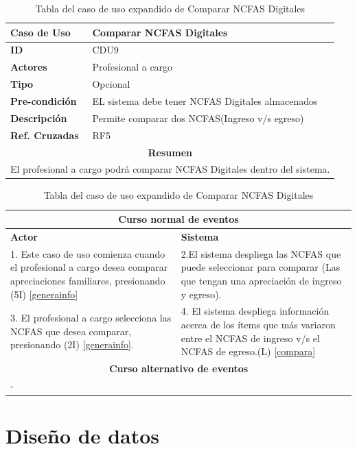 \begin{table}
	\centering
	\begin{tabular}{|p{6cm} |p{6cm}|}
		\hline \textbf{Caso de Uso} & Comparar NCFAS Digitales \\ 
		\hline \textbf{ID} & CDU9 \\ 
		\hline \textbf{Actores} & Profesional a cargo \\ 
		\hline \textbf{Tipo} & Opcional \\ 
		\hline \textbf{Pre-condición} & EL sistema debe tener NCFAS Digitales almacenados \\ 
		\hline \textbf{Descripción} & Permite comparar dos NCFAS(Ingreso v/s egreso) \\
		\hline \textbf{Ref. Cruzadas} & RF5 \\ 
		\hline
		\multicolumn{2}{|c|}{\textbf{Resumen}} \\
		\hline
		\multicolumn{2}{|p{12cm}|}{El profesional a cargo podrá comparar NCFAS Digitales dentro del sistema.} \\
		
	\end{tabular}  
	\begin{tabular}{|p{6cm}|p{6cm}|}
		\multicolumn{2}{|c|}{\textbf{Curso normal de eventos}} \\
		\hline \textbf{Actor} & \textbf{Sistema} \\ 
		\hline 1. Este caso de uso comienza cuando el profesional a cargo desea comparar apreciaciones familiares, presionando (5I) \ref{generainfo} & 2.El sistema despliega las NCFAS que puede seleccionar para comparar (Las que tengan una apreciación de ingreso y egreso).  \\ 
		3. El profesional a cargo selecciona las NCFAS que desea comparar, presionando (2I) \ref{generainfo}.& 4. El sistema despliega información acerca de los ítems que más variaron entre el NCFAS de ingreso v/s el NCFAS de egreso.(L) \ref{compara} \\
		\hline
		\multicolumn{2}{|c|}{\textbf{Curso alternativo de eventos}} \\
		\hline
		\multicolumn{2}{|p{12cm}|}{ - } \\
		\hline
	\end{tabular}
	\caption{Tabla del caso de uso expandido de Comparar NCFAS Digitales}
	\label{tabcdu99}
\end{table}

\clearpage

\section{Diseño de datos}  \label{disenodat}

